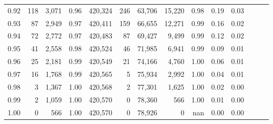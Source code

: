 \begin{tabular}{rrrrrrrrrrrrrr}
0.92 &    118 &  3,071 &  0.96 &  420,324 &      246 &  63,706 &  15,220 &  0.98 &  0.19 &      0.03 \\
0.93 &     87 &  2,949 &  0.97 &  420,411 &      159 &  66,655 &  12,271 &  0.99 &  0.16 &      0.02 \\
0.94 &     72 &  2,772 &  0.97 &  420,483 &       87 &  69,427 &   9,499 &  0.99 &  0.12 &      0.02 \\
0.95 &     41 &  2,558 &  0.98 &  420,524 &       46 &  71,985 &   6,941 &  0.99 &  0.09 &      0.01 \\
0.96 &     25 &  2,181 &  0.99 &  420,549 &       21 &  74,166 &   4,760 &  1.00 &  0.06 &      0.01 \\
0.97 &     16 &  1,768 &  0.99 &  420,565 &        5 &  75,934 &   2,992 &  1.00 &  0.04 &      0.01 \\
0.98 &      3 &  1,367 &  1.00 &  420,568 &        2 &  77,301 &   1,625 &  1.00 &  0.02 &      0.00 \\
0.99 &      2 &  1,059 &  1.00 &  420,570 &        0 &  78,360 &     566 &  1.00 &  0.01 &      0.00 \\
1.00 &      0 &    566 &  1.00 &  420,570 &        0 &  78,926 &       0 &   nan &  0.00 &      0.00 \\
\bottomrule
\end{tabular}
